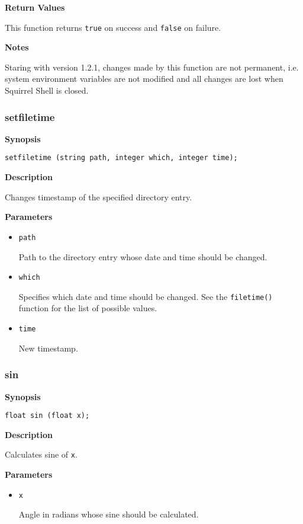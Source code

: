 \documentclass[a4paper, 10pt, titlepage]{article}
\begin{document}
\textbf{Return Values}

This function returns \texttt{true} on success and \texttt{false} on failure.

\textbf{Notes}

Staring with version 1.2.1, changes made by this function are not permanent, i.e. system environment variables are not modified and all changes are lost when Squirrel Shell is closed.

\subsubsection{setfiletime}

\textbf{Synopsis}

\begin{verbatim}
setfiletime (string path, integer which, integer time);
\end{verbatim}

\textbf{Description}

Changes timestamp of the specified directory entry.

\textbf{Parameters}

\begin{itemize}
\item \texttt{path}

Path to the directory entry whose date and time should be changed.

\item \texttt{which}

Specifies which date and time should be changed. See the \texttt{filetime()} function for the list of possible values.

\item \texttt{time}

New timestamp.
\end{itemize}

\subsubsection{sin}

\textbf{Synopsis}

\begin{verbatim}
float sin (float x);
\end{verbatim}

\textbf{Description}

Calculates sine of \texttt{x}.

\textbf{Parameters}

\begin{itemize}
\item \texttt{x}

Angle in radians whose sine should be calculated.
\end{itemize}
\end{document}
